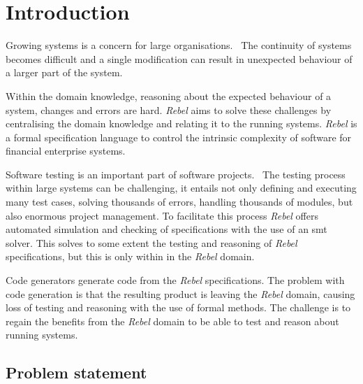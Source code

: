 \chapter{Introduction}

Growing systems is a concern for large
organisations.~\cite[p.~1]{stoel_storm_vinju_bosman_2016} The continuity of
systems becomes difficult and a single modification can result in unexpected
behaviour of a larger part of the system.

Within the domain knowledge, reasoning about the expected behaviour of a system,
changes and errors are hard. \textit{Rebel} aims to solve these challenges by centralising the domain knowledge and relating
it to the running systems. \textit{Rebel} is a formal specification language to
control the intrinsic complexity of software for financial
enterprise systems.~\cite[p.~1]{stoel_storm_vinju_bosman_2016}

Software testing is an important part of software projects.~\cite[p.~4]{myers2011art} The testing
process within large systems can be challenging, it entails not only defining
and executing many test cases, solving thousands of errors, handling
thousands of modules, but also enormous project management. To facilitate this
process \textit{Rebel} offers automated simulation and checking of specifications with
the use of an \gls{smt} solver. This solves to some
extent the testing and reasoning of \textit{Rebel} specifications, but this is only
within in the \textit{Rebel} domain.

Code generators generate code from the \textit{Rebel} specifications. The problem with code generation is that the resulting
product is leaving the \textit{Rebel} domain, causing loss of testing and reasoning with
the use of formal methods. The challenge is to regain the benefits from the
\textit{Rebel} domain to be able to test and reason about running systems.

\section{Problem statement}\label{sec:problem-statement}


